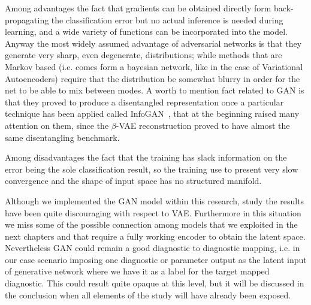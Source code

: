 Among advantages the fact that gradients can be obtained directly form back-propagating the classification error but no actual inference is needed during learning, and a wide variety of functions can be incorporated into the model.
Anyway the most widely assumed advantage of adversarial networks is that they generate very sharp, even degenerate, distributions; while methods that are Markov based (i.e. comes form a bayesian network, like in the case of Variational Autoencoders) require that the distribution be somewhat blurry in order for the net to be able to mix between modes.
A worth to mention fact related to GAN is that they proved to produce a disentangled representation once a particular technique has been applied called InfoGAN~\cite{NIPS2016_6399}, that at the beginning raised many attention on them, since the $\beta$-VAE reconstruction proved to have almost the same disentangling benchmark.

Among disadvantages the fact that the training has slack information on the error being the sole classification result, so the training use to present very slow convergence and the shape of input space has no structured manifold.

Although we implemented the GAN model within this research, study the results have been quite discouraging with respect to VAE. Furthermore in this situation we miss some of the possible connection among models that we exploited in the next chapters and that require a fully working encoder to obtain the latent space.
Nevertheless GAN could remain a good diagnostic to diagnostic mapping, i.e. in our case scenario imposing one diagnostic or parameter output as the latent input of generative network where we have it as a label for the target mapped diagnostic.
This could result quite opaque at this level, but it will be discussed in the conclusion when all elements of the study will have already been exposed.


